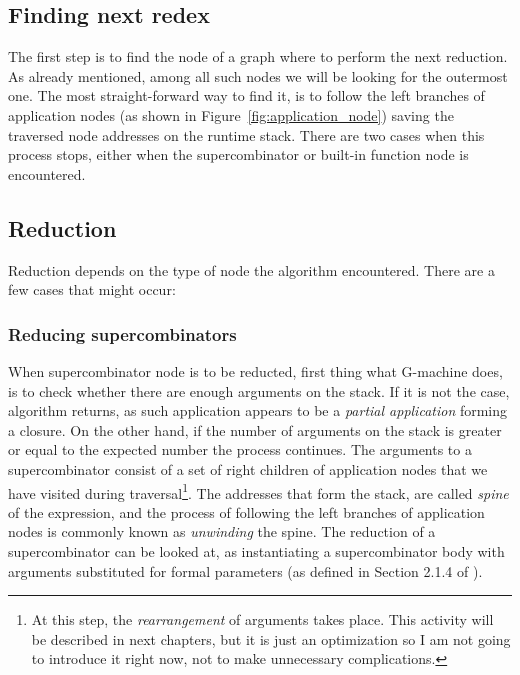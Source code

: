 \documentclass[12pt,a4paper]{report}
\begin{document}
\subsection{Finding next redex}
The first step is to find the node of a graph where to perform the next
reduction. As already mentioned, among all such nodes we will be looking for the
outermost one. The most straight-forward way to find it, is to follow the left
branches of application nodes (as shown in Figure~\ref{fig:application_node})
saving the traversed node addresses on the runtime stack. There are two cases
when this process stops, either when the supercombinator or built-in function
node is encountered.

\subsection{Reduction}
Reduction depends on the type of node the algorithm encountered. There are a
few cases that might occur:

\subsubsection{Reducing supercombinators}
When supercombinator node is to be reducted, first thing what G-machine does,
is to check whether there are enough arguments on the stack. If it is not the
case, algorithm returns, as such application appears to be a \textit{partial
application} forming a closure. On the other hand, if the number of arguments
on the stack is greater or equal to the expected number the process continues.
The arguments to a supercombinator consist of a set of right children of
application nodes that we have visited during traversal\footnote{At this step,
the \textit{rearrangement} of arguments takes place. This activity will be
described in next chapters, but it is just an optimization so I am not going to
introduce it right now, not to make unnecessary complications.}. The addresses
that form the stack, are called \textit{spine} of the expression, and the
process of following the left branches of application nodes is commonly known
as \textit{unwinding} the spine. The reduction of a supercombinator can be
looked at, as instantiating a supercombinator body with arguments substituted
for formal parameters (as defined in Section 2.1.4 of \cite{JonLes00}).
\end{document}
